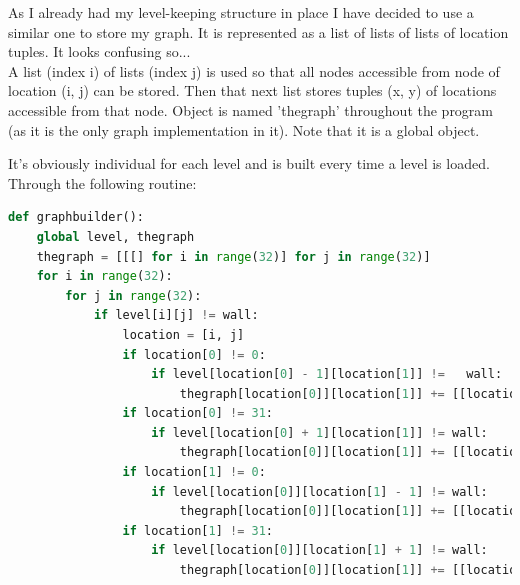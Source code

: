 \documentclass[11pt,a4paper]{report}
\begin{document}
					As I already had my level-keeping structure in place I have decided to use a similar one to store my graph. It is represented as a list of lists of lists of location tuples. It looks confusing so...\\
					A list (index i) of lists (index j) is used so that all nodes accessible from node of location (i, j) can be stored. Then that next list stores tuples (x, y) of locations accessible from that node.
					Object is named 'thegraph' throughout the program (as it is the only graph implementation in it). Note that it is a global object.
					
					It's obviously individual for each level and is built every time a level is loaded. Through the following routine:
					\begin{lstlisting}[language=Python]
def graphbuilder():
	global level, thegraph
	thegraph = [[[] for i in range(32)] for j in range(32)]
	for i in range(32):
		for j in range(32):
			if level[i][j] != wall:
				location = [i, j]
				if location[0] != 0:
					if level[location[0] - 1][location[1]] != 	wall:
						thegraph[location[0]][location[1]] += [[location[0] - 1, location[1]]]
				if location[0] != 31:
					if level[location[0] + 1][location[1]] != wall:
						thegraph[location[0]][location[1]] += [[location[0] + 1, location[1]]]
				if location[1] != 0:
					if level[location[0]][location[1] - 1] != wall:
						thegraph[location[0]][location[1]] += [[location[0], location[1] - 1]]
				if location[1] != 31:
					if level[location[0]][location[1] + 1] != wall:
						thegraph[location[0]][location[1]] += [[location[0], location[1] + 1]]
					\end{lstlisting}
\end{document}
